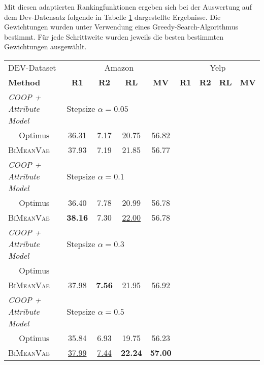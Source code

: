 Mit diesen adaptierten Rankingfunktionen ergeben sich bei der Auswertung auf dem Dev-Datensatz folgende in Tabelle \ref{dev_eval_results} dargestellte Ergebnisse.
Die Gewichtungen wurden unter Verwendung eines Greedy-Search-Algorithmus bestimmt.
Für jede Schrittweite wurden jeweils die besten bestimmten Gewichtungen ausgewählt.



\begin{table}[!h]
    \label{dev_eval_results}
    \centering
    \begin{tabular}{@{}lcccccccc@{}}
    \toprule
    DEV-Dataset                    & \multicolumn{4}{c}{Amazon} & \multicolumn{4}{c}{Yelp} \\ 
    \textbf{Method} & \textbf{R1} & \textbf{R2} & \textbf{RL} & \textbf{MV} & \textbf{R1} & \textbf{R2} & \textbf{RL} & \textbf{MV}\\ \midrule
    
    \textit{COOP + Attribute Model}        &      \multicolumn{3}{l}{Stepsize $\alpha= 0.05$}             &        &   & &     \\
    $\quad$ Optimus          &  36.31 & 7.17& 20.75&56.82 &     &      &   &      \\ 
    $\quad$ \textsc{BiMeanVae}   &  37.93 & 7.19& 21.85&56.77 &     &      &   &    \\ 
    
    \textit{COOP + Attribute Model}        &         \multicolumn{3}{l}{Stepsize $\alpha= 0.1$}            &        &   & &     \\
    $\quad$ Optimus            & 36.40  & 7.78&20.99 &56.78 &     &      &   &   \\ 
    $\quad$ \textsc{BiMeanVae} &  \textbf{38.16} & 7.30 & \underline{22.00} & 56.78&     &      &   &     \\ 

    \textit{COOP + Attribute Model}        &      \multicolumn{3}{l}{Stepsize $\alpha= 0.3$}                &        &        &   & &     \\
    $\quad$ Optimus            &   & & & &     &      &   &   \\ 
    $\quad$ \textsc{BiMeanVae} & 37.98  & \textbf{7.56} & 21.95& \underline{56.92} &     &      &   &     \\ 

    \textit{COOP + Attribute Model}        &    \multicolumn{3}{l}{Stepsize $\alpha= 0.5$}            &        &   & &     \\
       $\quad$ Optimus            & 35.84  &6.93 & 19.75& 56.23&     &      &   &   \\ 
    $\quad$ \textsc{BiMeanVae} &   \underline{37.99}&\underline{7.44} &\textbf{22.24} & \textbf{57.00}&     &      &   &     \\ \midrule



\end{tabular}
\end{table}
